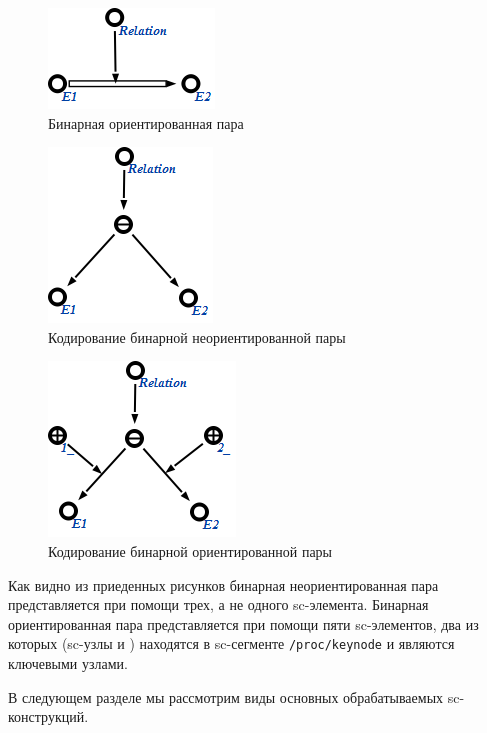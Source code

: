\begin{figure}[h!]
  \centering
  \includegraphics{images/4/scg2sc/Binary_orient_pair}
  \caption{Бинарная ориентированная пара}
  \label{fig:Binary_orient_pair}
\end{figure}

\begin{figure}[h!]
  \centering
  \includegraphics{images/4/scg2sc/Unpack_binary_unorient_pair}
  \caption{Кодирование бинарной неориентированной пары}
  \label{fig:Unpack_binary_unorient_pair}
\end{figure}

\begin{figure}[h!]
  \centering
  \includegraphics{images/4/scg2sc/Unpack_binary_orient_pair}
  \caption{Кодирование бинарной ориентированной пары}
  \label{fig:Unpack_binary_orient_pair}
\end{figure}

Как видно из приеденных рисунков бинарная неориентированная пара
представляется при помощи трех, а не одного sc-элемента. Бинарная
ориентированная пара представляется при помощи пяти sc-элементов, два
из которых (sc-узлы  и ) находятся в sc-сегменте
\verb|/proc/keynode| и являются ключевыми узлами.

В следующем разделе мы рассмотрим виды основных обрабатываемых
sc-конструкций.

